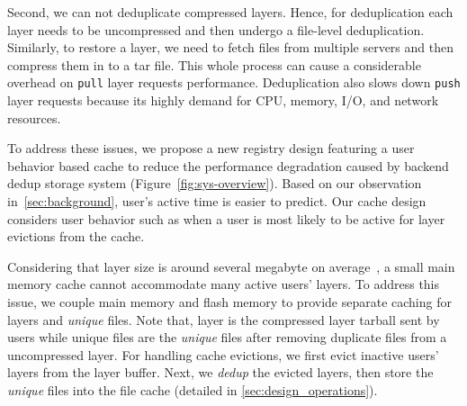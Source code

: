 %
Second, we can not deduplicate compressed layers. Hence, for deduplication each layer
needs to be uncompressed and then undergo a file-level deduplication. Similarly,
to restore a layer, we need to fetch files from multiple servers and then compress
them in to a tar file. 
This whole process can cause a 
considerable overhead on \texttt{pull} layer requests performance.
Deduplication also slows down
\texttt{push} layer requests because its highly demand for CPU, memory, I/O, and network resources.

To address these issues, we propose a new registry design featuring a user
behavior based cache to reduce the performance degradation caused by
backend dedup storage system (Figure~\ref{fig:sys-overview}).  Based
on our observation in~\cref{sec:background}, user's active time is easier to predict. 
Our cache design considers user
behavior such as when a user is most likely to be active for
layer evictions from the cache.

Considering that layer size is around several megabyte on
average~\cite{dockerworkload}, a small main memory cache cannot accommodate
many active users' layers. To address this issue, we couple main memory and
flash memory to provide separate caching for layers and \emph{unique} files.
Note that, layer is the compressed layer tarball sent by users
while unique files are the \emph{unique} files after removing duplicate files from a uncompressed layer.
For handling
cache evictions, we first evict inactive users' layers from the layer buffer.
Next, we \emph{dedup} the evicted layers, then store the \emph{unique} files
into the file cache (detailed in \cref{sec:design_operations}). 

